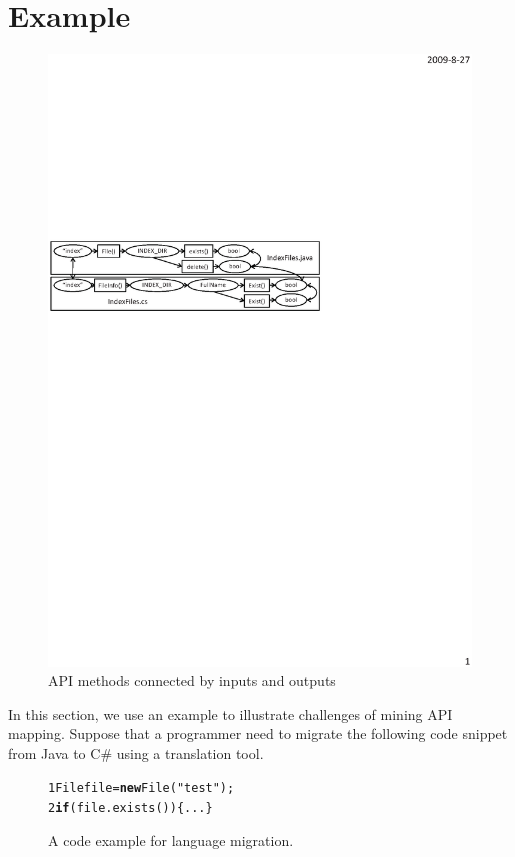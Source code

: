 \section{Example}
\label{sec:example}

\begin{figure}[t]
\centering
\includegraphics[scale=0.8,clip]{figure/dataflow.eps}\vspace*{-3ex}
 \caption
{\label{fig:dataflow}API methods connected by inputs and
outputs}\vspace*{-2ex}
\end{figure}

In this section, we use an example to illustrate challenges of
mining API mapping. Suppose that a programmer need to migrate the
following code snippet from Java to C\# using a translation tool.

\begin{figure}[t]
\begin{CodeOut}
\begin{alltt}
1  File file = \textbf{new} File("test");
2    \textbf{if}(file.exists())\{...\}
\end{alltt}
\end{CodeOut}\vspace*{-4ex}
\caption{\label{fig:totranslation} A code example for language migration.}\vspace*{-4ex}
\end{figure}

